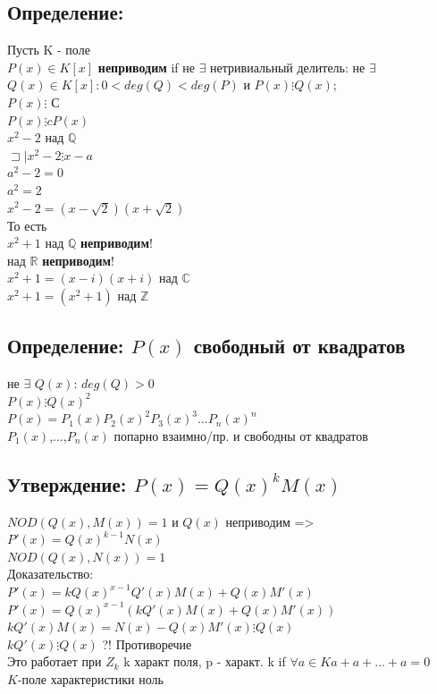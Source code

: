 \documentclass[12pt]{article}
\begin{document}
    \subsection{Определение:}
    \noindent Пусть K - поле
    \\$P(x)\in K[x]$  \textbf{неприводим} if не $\exists$ нетривиальный делитель: не $\exists$ $Q(x) \in K[x]: 0 < deg(Q) < deg(P)$ и $ P(x) \vdots Q(x) $;
        \\$ P(x) \vdots  $ С
    \\$ P(x) \vdots cP(x)$
        \\$x^2 - 2 $ над $\mathbb{Q}$
    \\$\sqsupset\mid x^2-2 \vdots x - a$
        \\$a^2-2=0$
    \\$a^2=2$
        \\$x^2-2=(x-\sqrt2)(x+\sqrt2)$
    \\То есть
    \\$x^2+1$ над $\mathbb{Q}$ \textbf{неприводим}!
        \\над $\mathbb{R}$ \textbf{неприводим}!
        \\$x^2+1=(x-i)(x+i)$ над $\mathbb{C}$
    \\$x^2+1=(x^2+1)$ над $\mathbb{Z}$
        \subsection{Определение: $P(x)$ свободный от квадратов }
        \noindent не $\exists$ $ Q(x)$: $deg(Q) > 0$
        \\$ P(x) \vdots Q(x)^2 $
    \\$ P(x) = {P_1(x)}{P_2(x)^2}{P_3(x)^3}$...${P_n(x)^n}$
        \\${P_1(x)}$,...,${P_n(x)}$ попарно взаимно/пр. и свободны от квадратов
    \subsection{Утверждение: $P(x) = Q(x)^kM(x)$}
    \noindent $NOD(Q(x),M(x)) = 1$ и $Q(x)$ неприводим => $P'(x) = Q(x)^{k-1}N(x)$
    \\$NOD(Q(x),N(x)) = 1$
        \\ Доказательство:
        \\$P'(x) = kQ(x)^{x-1}Q'(x)M(x)+Q(x)M'(x)$
    \\$P'(x) = Q(x)^{x-1}(kQ'(x)M(x)+Q(x)M'(x))$
        \\$kQ'(x)M(x)=N(x)- Q(x)M'(x) \vdots Q(x)$
    \\$kQ'(x)\vdots Q(x)$ ?! Противоречие
        \\Это работает при $Z_k$ k характ поля, p - характ. k if $\forall a\in K a+a+...+a=0 $
        \\$K$-поле характеристики ноль
\end{document}
